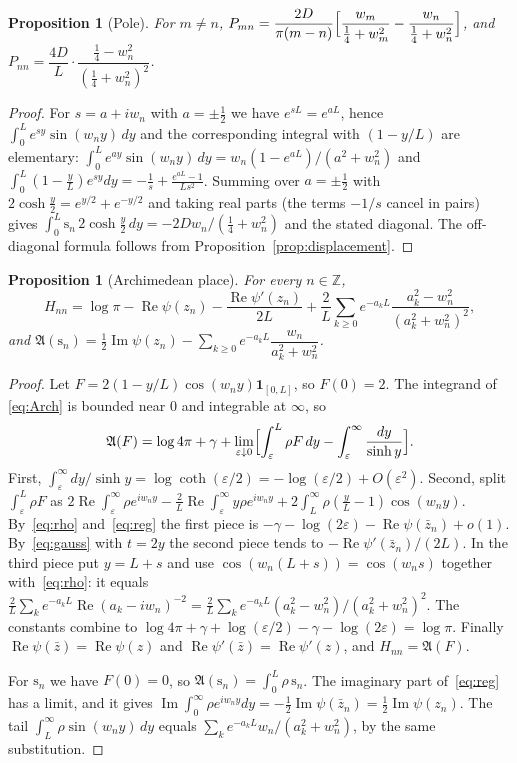 \documentclass[11pt,a4paper]{article}
\newtheorem{proposition}[theorem]{Proposition}
\theoremstyle{definition}
\newcommand{\Z}{\mathbb{Z}}
\newcommand{\eps}{\varepsilon}
\newcommand{\Arch}{\mathfrak{A}}
\newcommand{\sinw}{\mathrm{s}}
\DeclareMathOperator{\Ima}{Im}
\DeclareMathOperator{\Rea}{Re}
\begin{document}
\begin{proposition}[Pole]\label{prop:pole}
For $m\ne n$,
$P_{mn}=\dfrac{2D}{\pi(m-n)}\Bigl[\dfrac{w_m}{\frac14+w_m^2}-\dfrac{w_n}{\frac14+w_n^2}\Bigr]$,
and $P_{nn}=\dfrac{4D}{L}\cdot\dfrac{\frac14-w_n^2}{(\frac14+w_n^2)^2}$.
\end{proposition}

\begin{proof}
For $s=a+iw_n$ with $a=\pm\frac12$ we have $e^{sL}=e^{aL}$, hence
$\int_0^L e^{sy}\sin(w_n y)\,dy$ and the corresponding integral with
$(1-y/L)$ are elementary:
$\int_0^L e^{ay}\sin(w_ny)\,dy=w_n(1-e^{aL})/(a^2+w_n^2)$ and
$\int_0^L(1-\tfrac yL)e^{sy}dy=-\tfrac1s+\tfrac{e^{aL}-1}{Ls^2}$. Summing
over $a=\pm\frac12$ with $2\cosh\frac y2=e^{y/2}+e^{-y/2}$ and taking real
parts (the terms $-1/s$ cancel in pairs) gives
$\int_0^L\sinw_n\,2\cosh\frac y2\,dy=-2Dw_n/(\frac14+w_n^2)$ and the stated
diagonal. The off-diagonal formula follows from
Proposition~\ref{prop:displacement}.
\end{proof}

\begin{proposition}[Archimedean place]\label{prop:arch}
For every $n\in\Z$,
\[
H_{nn}=\log\pi-\Rea\psi(z_n)-\frac{\Rea\psi'(z_n)}{2L}+\frac2L\sum_{k\ge0}e^{-a_kL}\frac{a_k^2-w_n^2}{(a_k^2+w_n^2)^2},
\]
and $\Arch(\sinw_n)=\tfrac12\Ima\psi(z_n)-\sum_{k\ge0}e^{-a_kL}\dfrac{w_n}{a_k^2+w_n^2}$.
\end{proposition}

\begin{proof}
Let $F=2(1-y/L)\cos(w_ny)\mathbf 1_{[0,L]}$, so $F(0)=2$. The integrand of
\eqref{eq:Arch} is bounded near $0$ and integrable at $\infty$, so
\[
\Arch(F)=\log4\pi+\gamma+\lim_{\eps\downarrow0}\Bigl[\int_\eps^L\rho F\,dy-\int_\eps^\infty\frac{dy}{\sinh y}\Bigr].
\]
First, $\int_\eps^\infty dy/\sinh y=\log\coth(\eps/2)=-\log(\eps/2)+O(\eps^2)$.
Second, split $\int_\eps^L\rho F$ as
$2\Rea\int_\eps^\infty\rho e^{iw_ny}-\tfrac2L\Rea\int_\eps^\infty y\rho e^{iw_ny}+2\int_L^\infty\rho(\tfrac yL-1)\cos(w_ny)$.
By~\eqref{eq:rho} and~\eqref{eq:reg} the first piece is
$-\gamma-\log(2\eps)-\Rea\psi(\bar z_n)+o(1)$. By~\eqref{eq:gauss} with $t=2y$
the second piece tends to $-\Rea\psi'(\bar z_n)/(2L)$. In the third piece put
$y=L+s$ and use $\cos(w_n(L+s))=\cos(w_ns)$ together with~\eqref{eq:rho}:
it equals
$\tfrac2L\sum_ke^{-a_kL}\Rea(a_k-iw_n)^{-2}=\tfrac2L\sum_ke^{-a_kL}(a_k^2-w_n^2)/(a_k^2+w_n^2)^2$.
The constants combine to
$\log4\pi+\gamma+\log(\eps/2)-\gamma-\log(2\eps)=\log\pi$. Finally
$\Rea\psi(\bar z)=\Rea\psi(z)$ and $\Rea\psi'(\bar z)=\Rea\psi'(z)$, and
$H_{nn}=\Arch(F)$.

For $\sinw_n$ we have $F(0)=0$, so $\Arch(\sinw_n)=\int_0^L\rho\,\sinw_n$.
The imaginary part of~\eqref{eq:reg} has a limit, and it gives
$\Ima\int_0^\infty\rho e^{iw_ny}dy=-\tfrac12\Ima\psi(\bar z_n)=\tfrac12\Ima\psi(z_n)$.
The tail $\int_L^\infty\rho\sin(w_ny)\,dy$ equals
$\sum_ke^{-a_kL}w_n/(a_k^2+w_n^2)$, by the same substitution.
\end{proof}
\end{document}

